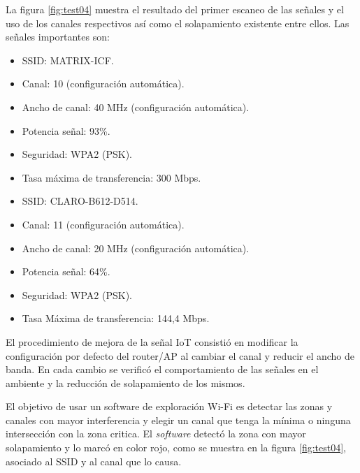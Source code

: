 La figura \ref{fig:test04} muestra el resultado del primer escaneo de las señales y el uso de los canales respectivos así como el solapamiento existente entre ellos. Las señales importantes son:

\begin{itemize}
\item SSID: MATRIX-ICF.
\item Canal: 10 (configuración automática).
\item Ancho de canal: 40 MHz (configuración automática).
\item Potencia señal: 93\%.
\item Seguridad:  WPA2 (PSK).
\item Tasa máxima de transferencia: 300 Mbps.
\end{itemize}


\begin{itemize} 
\item SSID: CLARO-B612-D514.
\item Canal: 11 (configuración automática).
\item Ancho de canal: 20 MHz (configuración automática).
\item Potencia señal: 64\%.
\item Seguridad: WPA2 (PSK).
\item Tasa Máxima de transferencia: 144,4 Mbps.
\end{itemize}

El procedimiento de mejora de la señal IoT consistió en modificar la configuración por defecto del router/AP al cambiar el canal y reducir el ancho de banda. En cada cambio se verificó el comportamiento de las señales en el ambiente y la reducción de solapamiento de los mismos.



El objetivo de usar un software de exploración Wi-Fi es detectar las zonas y canales con mayor interferencia y elegir un canal que tenga la mínima o ninguna intersección con la zona critica. El \emph{software} detectó la zona con mayor solapamiento y lo marcó en color rojo, como se muestra en la figura \ref{fig:test04}, asociado al SSID y al canal que lo causa.

